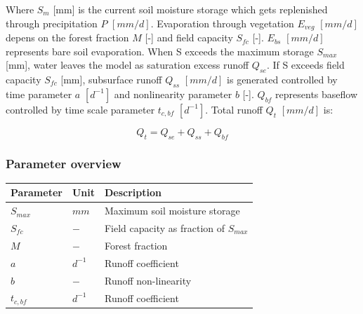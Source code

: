 Where $S_m$ [mm] is the current soil moisture storage which gets replenished through precipitation $P$ $[mm/d]$. 
Evaporation through vegetation $E_{veg}$ $[mm/d]$ depens on the forest fraction $M$ [-] and field capacity $S_{fc}$ [-]. 
$E_{bs}$ $[mm/d]$ represents bare soil evaporation. 
When S exceeds the maximum storage $S_{max}$ [mm], water leaves the model as saturation excess runoff $Q_{se}$. 
If S exceeds field capacity $S_{fc}$ [mm], subsurface runoff $Q_{ss}$ $[mm/d]$ is generated controlled by time parameter $a$ $[d^{-1}]$ and nonlinearity parameter $b$ [-]. 
$Q_{bf}$ represents baseflow controlled by time scale parameter $t_{c,bf}$ $[d^{-1}]$. Total runoff $Q_t$ $[mm/d]$ is:

\begin{equation}
	Q_t = Q_{se} + Q_{ss} + Q_{bf}
\end{equation}

\newpage
\subsubsection{Parameter overview}
\begin{table}[htbp]
  \centering
    \begin{tabular}{lll}
    \toprule
    Parameter & Unit  & Description \\
    \midrule
    $S_{max}$ & $mm$  & Maximum soil moisture storage \\
    $S_{fc}$ & $-$   & Field capacity as fraction of $S_{max}$ \\
    $M$   & $-$   & Forest fraction \\
    $a$   & $d^{-1}$ & Runoff coefficient \\
    $b$   & $-$   & Runoff non-linearity \\
    $t_{c,bf}$ & $d^{-1}$ & Runoff coefficient \\
    \bottomrule
    \end{tabular}%
  \label{tab:addlabel}%
\end{table}%



